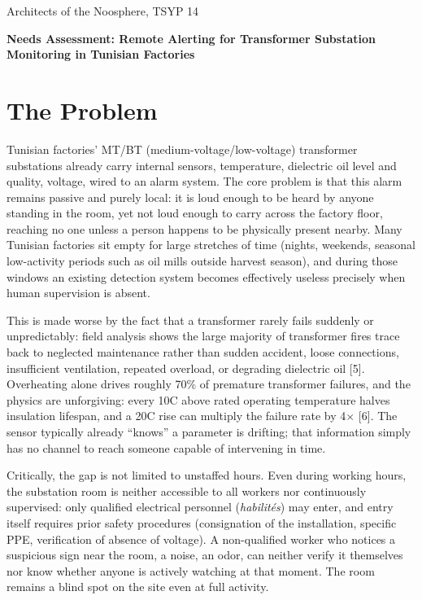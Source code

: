 \documentclass[10pt]{article}
\begin{document}
\begin{flushleft}
\small Architects of the Noosphere, TSYP 14
\end{flushleft}

\vspace{-2pt}
\begin{center}
\LARGE\bfseries\color{accent}Needs Assessment: Remote Alerting for Transformer Substation Monitoring in Tunisian Factories
\end{center}

\vspace{12pt}

\section{The Problem}
Tunisian factories' MT/BT (medium-voltage/low-voltage) transformer substations already carry internal sensors, temperature, dielectric oil level and quality, voltage, wired to an alarm system. The core problem is that this alarm remains passive and purely local: it is loud enough to be heard by anyone standing in the room, yet not loud enough to carry across the factory floor, reaching no one unless a person happens to be physically present nearby. Many Tunisian factories sit empty for large stretches of time (nights, weekends, seasonal low-activity periods such as oil mills outside harvest season), and during those windows an existing detection system becomes effectively useless precisely when human supervision is absent.

This is made worse by the fact that a transformer rarely fails suddenly or unpredictably: field analysis shows the large majority of transformer fires trace back to neglected maintenance rather than sudden accident, loose connections, insufficient ventilation, repeated overload, or degrading dielectric oil [5]. Overheating alone drives roughly 70\% of premature transformer failures, and the physics are unforgiving: every 10\textdegree{}C above rated operating temperature halves insulation lifespan, and a 20\textdegree{}C rise can multiply the failure rate by 4$\times$ [6]. The sensor typically already ``knows'' a parameter is drifting; that information simply has no channel to reach someone capable of intervening in time.

Critically, the gap is not limited to unstaffed hours. Even during working hours, the substation room is neither accessible to all workers nor continuously supervised: only qualified electrical personnel (\emph{habilit\'es}) may enter, and entry itself requires prior safety procedures (consignation of the installation, specific PPE, verification of absence of voltage). A non-qualified worker who notices a suspicious sign near the room, a noise, an odor, can neither verify it themselves nor know whether anyone is actively watching at that moment. The room remains a blind spot on the site even at full activity.
\end{document}
